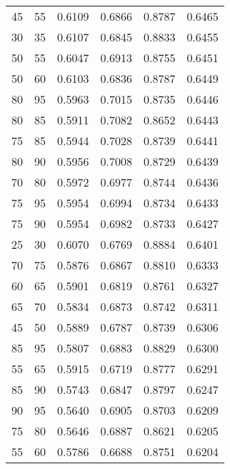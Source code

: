 \begin{center}
\begin{longtable}{|l|l|l|l|l|l|}
45                & 55                & 0.6109    & 0.6866 & 0.8787      & 0.6465    \\
30                & 35                & 0.6107    & 0.6845 & 0.8833      & 0.6455    \\
50                & 55                & 0.6047    & 0.6913 & 0.8755      & 0.6451    \\
50                & 60                & 0.6103    & 0.6836 & 0.8787      & 0.6449    \\
80                & 95                & 0.5963    & 0.7015 & 0.8735      & 0.6446    \\
80                & 85                & 0.5911    & 0.7082 & 0.8652      & 0.6443    \\
75                & 85                & 0.5944    & 0.7028 & 0.8739      & 0.6441    \\
80                & 90                & 0.5956    & 0.7008 & 0.8729      & 0.6439    \\
70                & 80                & 0.5972    & 0.6977 & 0.8744      & 0.6436    \\
75                & 95                & 0.5954    & 0.6994 & 0.8734      & 0.6433    \\
75                & 90                & 0.5954    & 0.6982 & 0.8733      & 0.6427    \\
25                & 30                & 0.6070    & 0.6769 & 0.8884      & 0.6401    \\
70                & 75                & 0.5876    & 0.6867 & 0.8810      & 0.6333    \\
60                & 65                & 0.5901    & 0.6819 & 0.8761      & 0.6327    \\
65                & 70                & 0.5834    & 0.6873 & 0.8742      & 0.6311    \\
45                & 50                & 0.5889    & 0.6787 & 0.8739      & 0.6306    \\
85                & 95                & 0.5807    & 0.6883 & 0.8829      & 0.6300    \\
55                & 65                & 0.5915    & 0.6719 & 0.8777      & 0.6291    \\
85                & 90                & 0.5743    & 0.6847 & 0.8797      & 0.6247    \\
90                & 95                & 0.5640    & 0.6905 & 0.8703      & 0.6209    \\
75                & 80                & 0.5646    & 0.6887 & 0.8621      & 0.6205    \\
55                & 60                & 0.5786    & 0.6688 & 0.8751      & 0.6204
\end{longtable}

\end{center}